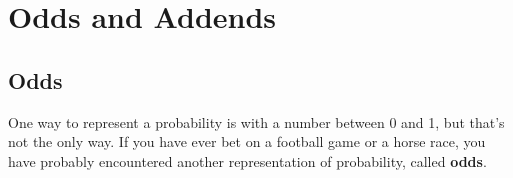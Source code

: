 \documentclass[12pt]{book}
\theoremstyle{exercise}
\newtheorem{exercise}{Exercise}[chapter]
\begin{document}
%
%
%
%
%
%
%
%
%
%
%







\chapter{Odds and Addends}

\section{Odds}

One way to represent a probability is with a number between 0 and 1, but that's not the only way.  
If you have ever bet on a football game or a horse race, you have probably encountered another representation of probability, called {\bf odds}.
\end{document}
